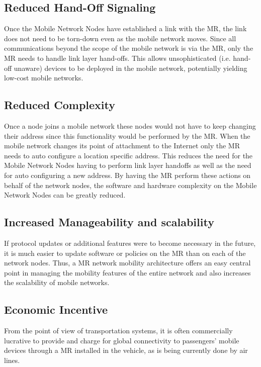 \subsection{Reduced Hand-Off Signaling}

Once the Mobile Network Nodes have established a link with the MR, the link
does not need to be torn-down even as the mobile network moves. Since all
communications beyond the scope of the mobile network is via the MR, only the
MR needs to handle link layer hand-offs. This allows unsophisticated (i.e.
hand-off unaware) devices to be deployed in the mobile network, potentially
yielding low-cost mobile networks.

\subsection{Reduced Complexity}

Once a node joins a mobile network these nodes would not have to keep changing
their address since this functionality would be performed by the MR. When the mobile network changes its point of attachment to the
Internet only the MR needs to auto configure a location specific address. This
reduces the need for the Mobile Network Nodes having to perform link layer
handoffs as well as the need for auto configuring a new address. By having the
MR perform these actions on behalf of the network nodes, the software and
hardware complexity on the Mobile Network Nodes can be greatly reduced.

\subsection{Increased Manageability and scalability}

If protocol updates or additional features were to become necessary in the
future, it is much easier to update software or policies on the MR than on
each of the network nodes. Thus, a MR network mobility architecture
offers an easy central point in managing the mobility features of the entire
network and also increases the scalability of mobile networks.

\subsection{Economic Incentive}

From the point of view of transportation systems, it is often commercially
lucrative to provide and charge for global connectivity to passengers' mobile
devices through a MR installed in the vehicle, as is being currently done by
air lines.

